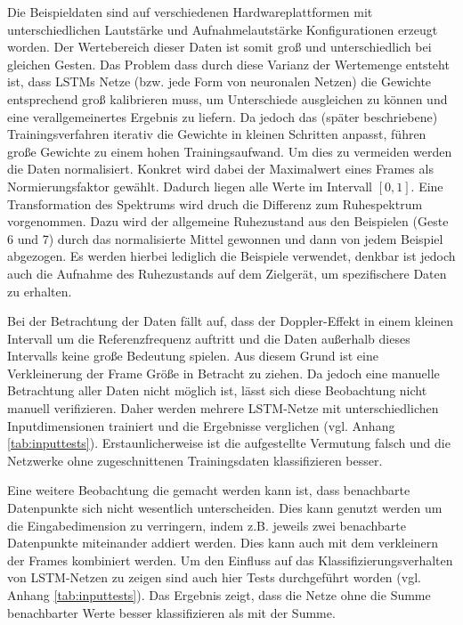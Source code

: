 Die Beispieldaten sind auf verschiedenen Hardwareplattformen mit
unterschiedlichen Lautstärke und Aufnahmelautstärke Konfigurationen erzeugt
worden. Der Wertebereich dieser Daten ist somit groß und unterschiedlich bei
gleichen Gesten. Das Problem dass durch diese Varianz der Wertemenge entsteht
ist, dass \acp{LSTM} Netze (bzw. jede Form von neuronalen Netzen) die Gewichte
entsprechend groß kalibrieren muss, um Unterschiede ausgleichen zu können und
eine verallgemeinertes Ergebnis zu liefern. Da jedoch das (später beschriebene)
Trainingsverfahren iterativ die Gewichte in kleinen Schritten anpasst, führen
große Gewichte zu einem hohen Trainingsaufwand. Um dies zu vermeiden werden die
Daten normalisiert. Konkret wird dabei der Maximalwert eines Frames als
Normierungsfaktor gewählt. Dadurch liegen alle Werte im Intervall $[0,1]$.
Eine Transformation des Spektrums wird druch die Differenz zum Ruhespektrum
vorgenommen. Dazu wird der allgemeine Ruhezustand aus den Beispielen (Geste 6
und 7) durch das normalisierte Mittel gewonnen und dann von jedem Beispiel
abgezogen. Es werden hierbei lediglich die Beispiele verwendet, denkbar ist
jedoch auch die Aufnahme des Ruhezustands auf dem Zielgerät, um spezifischere
Daten zu erhalten.

Bei der Betrachtung der Daten fällt auf, dass der Doppler-Effekt in einem
kleinen Intervall um die Referenzfrequenz auftritt und die Daten außerhalb
dieses Intervalls keine große Bedeutung spielen. Aus diesem Grund ist eine
Verkleinerung der Frame Größe in Betracht zu ziehen. Da jedoch eine manuelle
Betrachtung aller Daten nicht möglich ist, lässt sich diese Beobachtung nicht
manuell verifizieren. Daher werden mehrere \ac{LSTM}-Netze mit unterschiedlichen
Inputdimensionen trainiert und die Ergebnisse verglichen (vgl. Anhang
\autoref{tab:inputtests}). Erstaunlicherweise ist die aufgestellte Vermutung falsch
und die Netzwerke ohne zugeschnittenen Trainingsdaten klassifizieren besser.

Eine weitere Beobachtung die gemacht werden kann ist, dass benachbarte
Datenpunkte sich nicht wesentlich unterscheiden. Dies kann genutzt werden um die
Eingabedimension zu verringern, indem z.B. jeweils zwei benachbarte Datenpunkte
miteinander addiert werden. Dies kann auch mit dem verkleinern der Frames
kombiniert werden. Um den Einfluss auf das Klassifizierungsverhalten von
\ac{LSTM}-Netzen zu zeigen sind auch hier Tests durchgeführt worden (vgl. Anhang
\autoref{tab:inputtests}). Das Ergebnis zeigt, dass die Netze ohne
die Summe benachbarter Werte besser klassifizieren als mit der Summe. 

